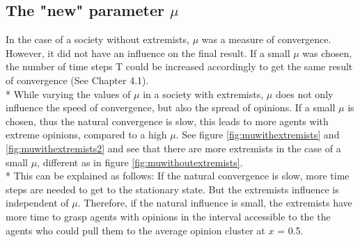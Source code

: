 \documentclass[11pt]{article}
\begin{document}
\subsection{The "new" parameter \texorpdfstring{$\mu$}{TEXT}}
In the case of a society without extremists, $\mu$ was a measure of convergence. However, it did not have an influence on the final result. If a small $\mu$ was chosen, the number of time steps T could be increased accordingly to get the same result of convergence (See Chapter 4.1). \\*
While varying the values of $\mu$ in a society with extremists, $\mu$ does not only influence the speed of convergence, but also the spread of opinions. If a small $\mu$ is chosen, thus the natural convergence is slow, this leads to more agents with extreme opinions, compared to a high $\mu$. See figure \ref{fig:muwithextremists} and \ref{fig:muwithextremists2} and see that there are more extremists in the case of a small $\mu$, different as in figure  \ref{fig:muwithoutextremists}.\\*
This can be explained as follows: If the natural convergence is slow, more time steps are needed to get to the stationary state. But the extremists influence is independent of $\mu$. Therefore, if the natural influence is small, the extremists have more time to grasp agents with opinions in the interval accessible to the the agents who could pull them to the average opinion cluster at $x$ = 0.5.
\end{document}
